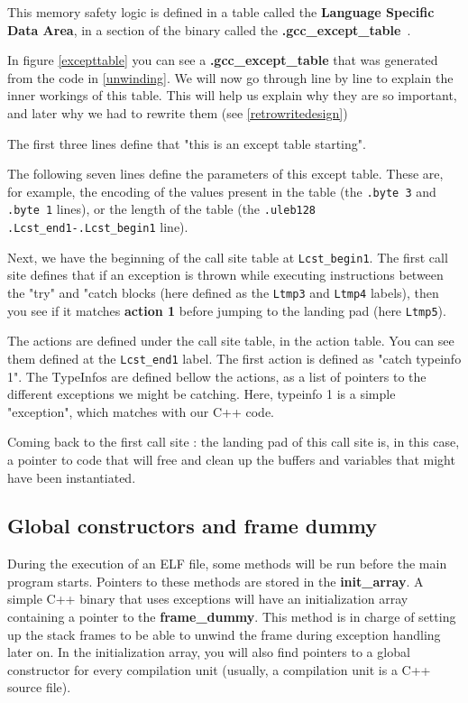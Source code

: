 \documentclass[a4paper,11pt,oneside]{report}
\begin{document}
This memory safety logic is defined in a table called the \textbf{Language
Specific Data Area}, in a section of the binary called the
\textbf{.gcc\_except\_table}~\cite{airsexcepttable}.

In figure \autoref{excepttable} you can see a \textbf{.gcc\_except\_table} that was
generated from the code in \autoref{unwinding}. We will now go through line by
line to explain the inner workings of this table.
This will help us explain why they are so important, and later why we had to
rewrite them (see \autoref{retrowritedesign})

The first three lines define that "this is an except table starting".

The following seven lines define the parameters of this except table.
These are, for example, the encoding of the values present in the table (the
\texttt{.byte 3} and \texttt{.byte 1} lines), or the length of the table (the
\texttt{.uleb128 .Lcst\_end1-.Lcst\_begin1} line).

Next, we have the beginning of the call site table at \texttt{Lcst\_begin1}.
The first call site defines that if an exception is thrown while executing
instructions between the "try" and "catch blocks (here defined as the
\texttt{Ltmp3} and \texttt{Ltmp4} labels), then you see if it matches
\textbf{action 1} before jumping to the landing pad (here \texttt{Ltmp5}).

The actions are defined under the call site table, in the action table. You
can see them defined at the \texttt{Lcst\_end1} label.
The first action is defined as "catch typeinfo 1". The TypeInfos are defined
bellow the actions, as a list of pointers to the different exceptions we might
be catching. Here, typeinfo 1 is a simple "exception", which matches with our
C++ code.

Coming back to the first call site : the landing pad of this call site is, in
this case, a pointer to code that will free and clean up the buffers and
variables that might have been instantiated.



\subsection{Global constructors and frame dummy}
\label{framedummy}

During the execution of an ELF file, some methods will be run before the main
program starts. Pointers to these methods are stored in the
\textbf{init\_array}.
A simple C++ binary that uses exceptions will have an initialization array
containing a pointer to the \textbf{frame\_dummy}. This method is in charge of
setting up the stack frames to be able to unwind the frame during exception
handling later on.
In the initialization array, you will also find pointers to a global
constructor for every compilation unit (usually, a compilation unit is a C++
source file).
\end{document}
